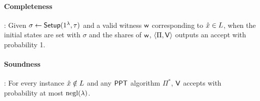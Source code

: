 \paragraph{Completeness}: %
Given $\sigma \gets \mathsf{Setup}(1^{\lambda}, \tau)$ and a valid witness $\mathsf{w}$ corresponding to $\hat{x} \in L$, when the initial states are set with $\sigma$ and the shares of $\mathsf{w}$, $\langle \Pi, \mathsf{V} \rangle$ outputs an accept with probability 1.

\paragraph{Soundness}:  For every instance $\hat{x} \notin L$ and any $\mathsf{PPT}$ algorithm $\Pi^*$, $\mathsf{V}$ accepts with probability at most $\mathrm{negl}({\lambda})$.

